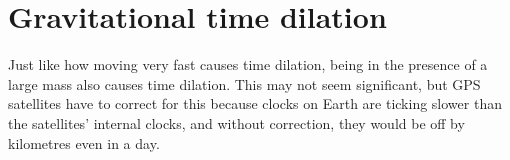\documentclass[10pt]{article}
\begin{document}
\section{Gravitational time dilation}

Just like how moving very fast causes time dilation, being in the presence of a large mass also causes time dilation. This may not seem significant, but GPS satellites have to correct for this because clocks on Earth are ticking slower than the satellites' internal clocks, and without correction, they would be off by kilometres even in a day.




\end{document}
